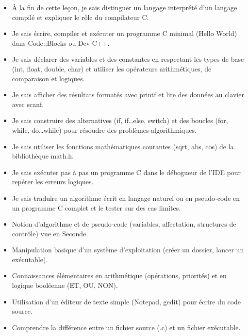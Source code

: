 \documentclass[11pt]{article}
\begin{document}
\begin{objectifs}
\begin{itemize}
\item À la fin de cette leçon, je sais distinguer un langage interprété d'un langage compilé et expliquer le rôle du compilateur C.
\item Je sais écrire, compiler et exécuter un programme C minimal (Hello World) dans Code::Blocks ou Dev‑C++.
\item Je sais déclarer des variables et des constantes en respectant les types de base (int, float, double, char) et utiliser les opérateurs arithmétiques, de comparaison et logiques.
\item Je sais afficher des résultats formatés avec printf et lire des données au clavier avec scanf.
\item Je sais construire des alternatives (if, if…else, switch) et des boucles (for, while, do…while) pour résoudre des problèmes algorithmiques.
\item Je sais utiliser les fonctions mathématiques courantes (sqrt, abs, cos) de la bibliothèque math.h.
\item Je sais exécuter pas à pas un programme C dans le débogueur de l'IDE pour repérer les erreurs logiques.
\item Je sais traduire un algorithme écrit en langage naturel ou en pseudo‑code en un programme C complet et le tester sur des cas limites.
\end{itemize}
\end{objectifs}

\begin{prerequis}
\begin{itemize}
\item Notion d'algorithme et de pseudo‑code (variables, affectation, structures de contrôle) vue en Seconde.
\item Manipulation basique d'un système d'exploitation (créer un dossier, lancer un exécutable).
\item Connaissances élémentaires en arithmétique (opérations, priorités) et en logique booléenne (ET, OU, NON).
\item Utilisation d'un éditeur de texte simple (Notepad, gedit) pour écrire du code source.
\item Comprendre la différence entre un fichier source (.c) et un fichier exécutable.
\end{itemize}
\end{prerequis}

\newpage
\end{document}

